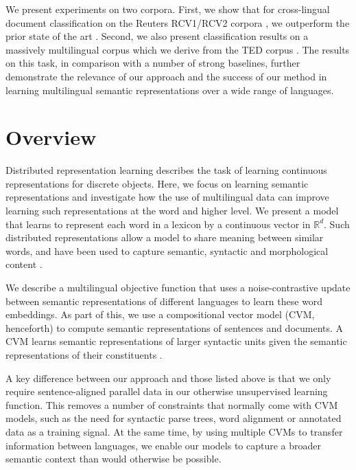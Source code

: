 \documentclass[11pt]{article}
\newcommand{\CVM}{\textsc{CVM}\xspace}
\begin{document}
We present experiments on two corpora.  First, we show that for cross-lingual
document classification on the Reuters RCV1/RCV2 corpora \cite{Lewis:2004}, we
outperform the prior state of the art \cite{Klementiev:2012}. Second, we also
present classification results on a massively multilingual corpus which we
derive from the TED corpus \cite{Cettolo:2012}. The results on this task, in
comparison with a number of strong baselines, further demonstrate the relevance
of our approach and the success of our method in learning multilingual semantic
representations over a wide range of languages.
 \section{Overview}

Distributed representation learning describes the task of learning continuous
representations for discrete objects.  Here, we focus on learning semantic
representations and investigate how the use of multilingual data can improve
learning such representations at the word and higher level.  We
present a model that learns to represent each word in a lexicon by a continuous
vector in $\mathbb{R}^d$.  Such distributed representations allow a model to
share meaning between similar words, and have been used to capture semantic,
syntactic and morphological content \cite[\textit{inter
    alia}]{Collobert:2008,Turian:2010}.

We describe a multilingual objective function that uses a noise-contrastive
update between semantic representations of different languages to learn these
word embeddings. As part of this, we use a compositional vector model (\CVM,
  henceforth) to compute semantic representations of sentences and documents. A
\CVM learns semantic representations of larger syntactic units given the
semantic representations of their constituents \cite[\textit{inter
    alia}]{Clark:2007a,Mitchell:2008,Baroni:2010,Grefenstette:2011,Socher:2012,Hermann:2013:ACL}.

A key difference between our approach and those listed above is that we only
require sentence-aligned parallel data in our otherwise unsupervised learning
function. This removes a number of constraints that normally come with \CVM
models, such as the need for syntactic parse trees, word alignment or annotated
data as a training signal. At the same time, by using multiple \CVM{s} to transfer
information between languages, we enable our models to capture a broader
semantic context than would otherwise be possible.
\end{document}
